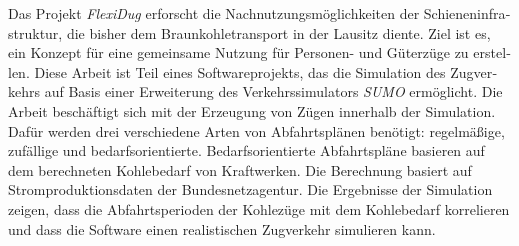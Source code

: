 
%
%



\null\vfil
\begin{otherlanguage}{ngerman}
\begin{center}\textsf{\textbf{\abstractname}}\end{center}

\noindent Das Projekt \emph{FlexiDug} erforscht die Nachnutzungsmöglichkeiten der Schieneninfrastruktur, die bisher dem Braunkohletransport in der Lausitz diente. Ziel ist es, ein Konzept für eine gemeinsame Nutzung für Personen- und Güterzüge zu erstellen. Diese Arbeit ist Teil eines Softwareprojekts, das die Simulation des Zugverkehrs auf Basis einer Erweiterung des Verkehrssimulators \emph{SUMO} ermöglicht. Die Arbeit beschäftigt sich mit der Erzeugung von Zügen innerhalb der Simulation. Dafür werden drei verschiedene Arten von Abfahrtsplänen benötigt: regelmäßige, zufällige und bedarfsorientierte. Bedarfsorientierte Abfahrtspläne basieren auf dem berechneten Kohlebedarf von Kraftwerken. Die Berechnung basiert auf Stromproduktionsdaten der Bundesnetzagentur. Die Ergebnisse der Simulation zeigen, dass die Abfahrtsperioden der Kohlezüge mit dem Kohlebedarf korrelieren und dass die Software einen realistischen Zugverkehr simulieren kann.

\end{otherlanguage}
\vfil\null



